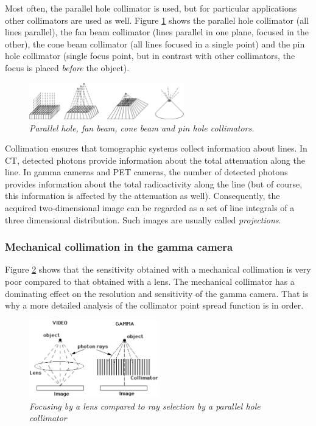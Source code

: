 \documentclass[11pt,oneside]{article}
\begin{document}
Most often, the parallel hole collimator is used, but for particular
applications other collimators are used as well. Figure \ref{fig:collimators}
shows the parallel hole collimator (all lines parallel), the fan beam
collimator (lines parallel in one plane, focused in the other), the cone beam
collimator (all lines focused in a single point) and the pin hole collimator
(single focus point, but in contrast with other collimators, the focus is
placed {\em before} the object).

\begin{figure}[tb]
\centering
\includegraphics[width=0.6\textwidth]{figs/fig_collimators.pdf}
\caption{\label{fig:collimators} \emph{Parallel hole, fan beam, cone beam and
pin hole collimators.}}
\end{figure}

Collimation ensures that tomographic systems collect information about
lines.  In CT, detected photons provide information about the total
attenuation along the line. In gamma cameras and PET cameras, the
number of detected photons provides information about the total
radioactivity along the line (but of course, this information is
affected by the attenuation as well). Consequently, the acquired
two-dimensional image can be regarded as a set of line integrals of a
three dimensional distribution. Such images are usually called {\em
projections}.

\subsubsection{Mechanical collimation in the gamma camera} \label{sec:collimation}
Figure \ref{fig:lenscollimator} shows that the sensitivity obtained
with a mechanical collimation is very poor compared to that obtained with a
lens. The mechanical collimator has a dominating effect on the resolution and
sensitivity of the gamma camera. That is why a more detailed analysis of the
collimator point spread function is in order.

\begin{figure}[tb]
\centering
\includegraphics[width=0.5\textwidth]{figs/fig_lenscollimator.pdf}
\caption{\label{fig:lenscollimator} \emph{Focusing by a lens compared to ray
selection by a parallel hole collimator}}
\end{figure}
\end{document}
